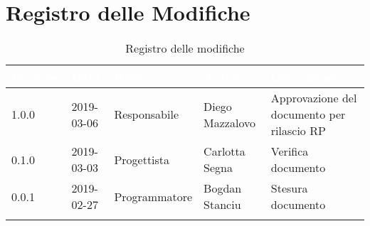\newpage

\section*{Registro delle Modifiche}

\begin{center}
\begin{longtable}[c]{|m{}|m{}|m{}|m{}|p{}|}
\hline
\rowcolor{bluelogo}\textbf{\textcolor{white}{Versione}} & \textbf{\textcolor{white}{Data}} & \textbf{\textcolor{white}{Ruolo}} & \textbf{\textcolor{white}{Autore}} & \textbf{\textcolor{white}{Descrizione}}\\
\hline \hline
\endfirsthead
\hline
1.0.0 & 2019-03-06 & Responsabile & Diego Mazzalovo & Approvazione del documento per rilascio RP\\
\hline
\rowcolor{grigio} 0.1.0 & 2019-03-03 & Progettista & Carlotta Segna & Verifica documento \\
\hline
0.0.1 & 2019-02-27 & Programmatore & Bogdan Stanciu & Stesura documento \\
\hline
\caption{Registro delle modifiche}
\end{longtable}
\end{center}
